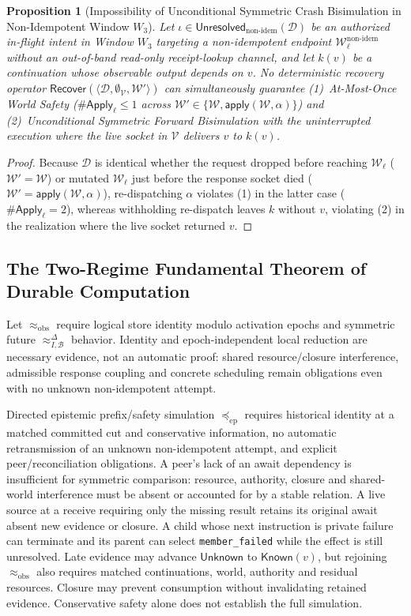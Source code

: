\documentclass[11pt,a4paper]{article}
\newtheorem{proposition}[theorem]{Proposition}
\theoremstyle{definition}
\theoremstyle{remark}
\begin{document}
\begin{proposition}[Impossibility of Unconditional Symmetric Crash Bisimulation in Non-Idempotent Window $W_3$]
\label{prop:impossibility}
Let $\iota \in \mathsf{Unresolved}_{\text{non-idem}}(\mathcal{D})$ be an authorized in-flight intent in Window $W_3$ targeting a non-idempotent endpoint $\mathcal{W}_{\ell}^{\text{non-idem}}$ without an out-of-band read-only receipt-lookup channel, and let $k(v)$ be a continuation whose observable output depends on $v$. No deterministic recovery operator $\mathsf{Recover}(\langle \mathcal{D}, \emptyset_{\mathcal{V}}, \mathcal{W}' \rangle)$ can simultaneously guarantee (1)~At-Most-Once World Safety ($\#\mathsf{Apply}_{\ell} \le 1$ across $\mathcal{W}' \in \{\mathcal{W}, \mathsf{apply}(\mathcal{W}, \alpha)\}$) and (2)~Unconditional Symmetric Forward Bisimulation with the uninterrupted execution where the live socket in $\mathcal{V}$ delivers $v$ to $k(v)$.
\end{proposition}
\begin{proof}
Because $\mathcal{D}$ is identical whether the request dropped before reaching $\mathcal{W}_\ell$ ($\mathcal{W}' = \mathcal{W}$) or mutated $\mathcal{W}_\ell$ just before the response socket died ($\mathcal{W}' = \mathsf{apply}(\mathcal{W}, \alpha)$), re-dispatching $\alpha$ violates (1) in the latter case ($\#\mathsf{Apply}_{\ell} = 2$), whereas withholding re-dispatch leaves $k$ without $v$, violating (2) in the realization where the live socket returned $v$.
\end{proof}

\subsection{The Two-Regime Fundamental Theorem of Durable Computation}
Let $\approx_{\mathrm{obs}}$ require logical store identity modulo activation epochs and symmetric future $\approx^{\Delta}_{I,\mathcal{B}}$ behavior. Identity and epoch-independent local reduction are necessary evidence, not an automatic proof: shared resource/closure interference, admissible response coupling and concrete scheduling remain obligations even with no unknown non-idempotent attempt.

Directed epistemic prefix/safety simulation $\preccurlyeq_{\mathrm{ep}}$ requires historical identity at a matched committed cut and conservative information, no automatic retransmission of an unknown non-idempotent attempt, and explicit peer/reconciliation obligations. A peer's lack of an await dependency is insufficient for symmetric comparison: resource, authority, closure and shared-world interference must be absent or accounted for by a stable relation. A live source at a receive requiring only the missing result retains its original await absent new evidence or closure. A child whose next instruction is private failure can terminate and its parent can select \texttt{member\_failed} while the effect is still unresolved. Late evidence may advance $\mathsf{Unknown}$ to $\mathsf{Known}(v)$, but rejoining $\approx_{\mathrm{obs}}$ also requires matched continuations, world, authority and residual resources. Closure may prevent consumption without invalidating retained evidence. Conservative safety alone does not establish the full simulation.
\end{document}
